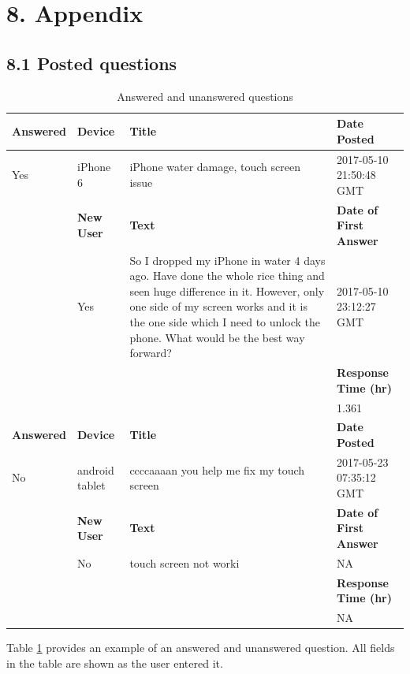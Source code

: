 \documentclass{article}
\begin{document}
\section*{8. Appendix} 

\subsection*{8.1 Posted questions}

\begin{table}[!htbp]
\centering
\begin{tabular}{| l | l | p{6cm} | l |}
  \hline
 \textbf{Answered} & \textbf{Device} & \textbf{Title} & \textbf{Date Posted} \\
  \hline
  Yes & iPhone 6 & iPhone water damage, touch screen issue &  2017-05-10 21:50:48 GMT \\ \cline{2 - 4}
  & \textbf{New User} & \textbf{Text} & \textbf{Date of First Answer} \\ \cline{2 - 4}
  & Yes & So I dropped my iPhone in water 4 days ago. Have done the whole rice thing and seen huge difference in it. However, only one side of my screen works and it is the one side which I need to unlock the phone. What would be the best way forward? & 2017-05-10 23:12:27 GMT \\ \cline{4 - 4}
  & & & \textbf{Response Time (hr)} \\ \cline{4 - 4}
  & & & 1.361 \\ \cline{4-4} \hline
  \textbf{Answered} & \textbf{Device} & \textbf{Title} & \textbf{Date Posted} \\ \cline{1 - 4}
  No & android tablet & ccccaaaan you help me fix my touch screen & 2017-05-23 07:35:12 GMT \\ \cline{2 - 4}
  & \textbf{New User} & \textbf{Text} & \textbf{Date of First Answer} \\ \cline{2 - 4}
  & No & touch screen not worki & NA \\ \cline{4 - 4}
  & & & \textbf{Response Time (hr)} \\ \cline{4 - 4}
  & & & NA \\ 
   \hline
\end{tabular}
\caption{Answered and unanswered questions}
\label{table:questions}
\end{table}

Table \ref{table:questions} provides an example of an answered and unanswered question. All fields in the table are shown as the user entered it. 
\end{document}
